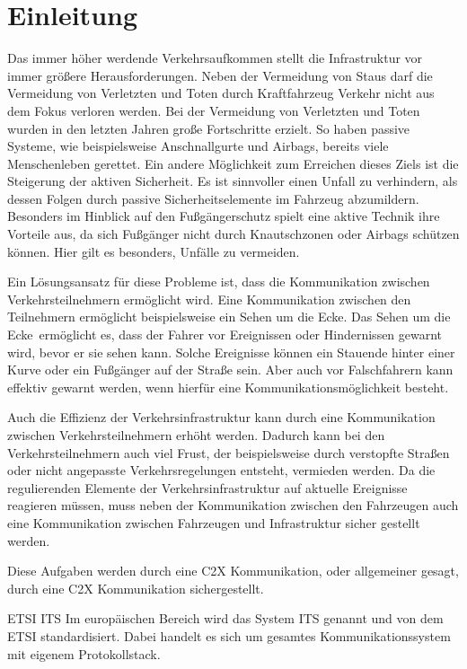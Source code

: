 \chapter{Einleitung \label{chap_einleitung}}
Das immer höher werdende Verkehrsaufkommen stellt die Infrastruktur vor immer größere Herausforderungen. Neben der Vermeidung von Staus darf die Vermeidung von Verletzten und Toten durch Kraftfahrzeug Verkehr nicht aus dem Fokus verloren werden. Bei der Vermeidung von Verletzten und Toten wurden in den letzten Jahren große Fortschritte erzielt. So haben passive Systeme, wie beispielsweise Anschnallgurte und Airbags, bereits viele Menschenleben gerettet. Ein andere Möglichkeit zum Erreichen dieses Ziels ist die Steigerung der aktiven Sicherheit. Es ist sinnvoller einen Unfall zu verhindern, als dessen Folgen durch passive Sicherheitselemente im Fahrzeug abzumildern. Besonders im Hinblick auf den Fußgängerschutz spielt eine aktive Technik ihre Vorteile aus, da sich Fußgänger nicht durch Knautschzonen oder Airbags schützen können. Hier gilt es besonders, Unfälle zu vermeiden.

Ein Lösungsansatz für diese Probleme ist, dass die Kommunikation zwischen Verkehrsteilnehmern ermöglicht wird. Eine Kommunikation zwischen den Teilnehmern ermöglicht beispielsweise ein \glqq Sehen um die Ecke\grqq. Das \glqq Sehen um die Ecke\grqq~ermöglicht es, dass der Fahrer vor Ereignissen oder Hindernissen gewarnt wird, bevor er sie sehen kann. Solche Ereignisse können ein Stauende hinter einer Kurve oder ein Fußgänger auf der Straße sein. Aber auch vor Falschfahrern kann effektiv gewarnt werden, wenn hierfür eine Kommunikationsmöglichkeit besteht.

Auch die Effizienz der Verkehrsinfrastruktur kann durch eine Kommunikation zwischen Verkehrsteilnehmern erhöht werden. Dadurch kann bei den Verkehrsteilnehmern auch viel Frust, der beispielsweise durch verstopfte Straßen oder nicht angepasste Verkehrsregelungen entsteht, vermieden werden. Da die regulierenden Elemente der Verkehrsinfrastruktur auf aktuelle Ereignisse reagieren müssen, muss neben der Kommunikation zwischen den Fahrzeugen auch eine Kommunikation zwischen Fahrzeugen und Infrastruktur sicher gestellt werden.

Diese Aufgaben werden durch eine \ac{C2X} Kommunikation, oder allgemeiner gesagt, durch eine \ac{C2X} Kommunikation sichergestellt. 

\ac{ETSI ITS}
Im europäischen Bereich wird das System \ac{ITS} genannt und von dem \ac{ETSI} standardisiert. Dabei handelt es sich um gesamtes Kommunikationssystem mit eigenem Protokollstack. 

